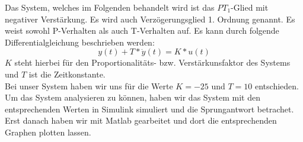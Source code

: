 
Das System, welches im Folgenden behandelt wird ist das $PT_1$-Glied mit negativer Verstärkung. Es wird auch Verzögerungsglied 1. Ordnung genannt. Es weist sowohl P-Verhalten als auch T-Verhalten auf. Es kann durch folgende Differentialgleichung beschrieben werden:
\begin{equation*}
  y(t)+T* \dot y(t) = K*u(t)
\end{equation*}
$K$ steht hierbei für den Proportionalitäts- bzw. Verstärkunsfaktor des Systems und $T$ ist die Zeitkonstante.\\
Bei unser System haben wir uns für die Werte $K=-25$ und $T=10$ entschieden.\\
Um das System analysieren zu können, haben wir das System mit den entsprechenden Werten in Simulink simuliert und die Sprungantwort betrachet. Erst danach haben wir mit Matlab gearbeitet und dort die entsprechenden Graphen plotten lassen.
